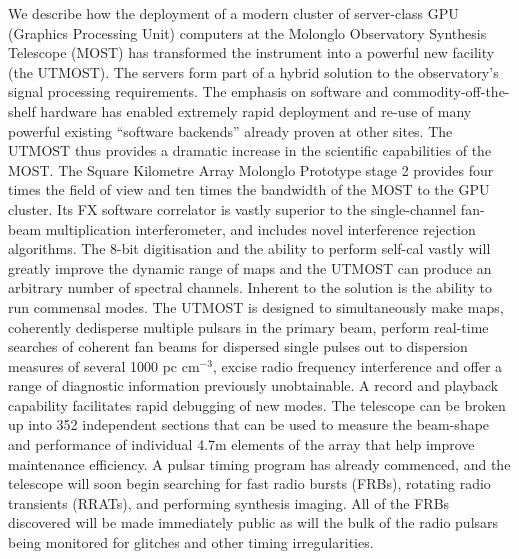 We describe how the deployment of a modern cluster of server-class GPU (Graphics Processing Unit) computers at the Molonglo Observatory Synthesis Telescope (MOST) has transformed the instrument into a powerful new facility (the UTMOST). The servers form part of a hybrid solution to the observatory's signal processing requirements. The emphasis on software and commodity-off-the-shelf hardware has enabled extremely rapid deployment and re-use of many powerful existing ``software backends'' already proven at other sites. The UTMOST thus provides a dramatic increase in the scientific capabilities of the MOST. The Square Kilometre Array Molonglo Prototype stage 2 provides four times the field of view and ten times the bandwidth of the MOST to the GPU cluster. Its FX software correlator is vastly superior to the single-channel fan-beam multiplication interferometer, and includes novel interference rejection algorithms. The 8-bit digitisation and the ability to perform self-cal vastly will greatly improve the dynamic range of maps and the UTMOST can produce an arbitrary number of spectral channels. Inherent to the solution is the ability to run commensal modes. The UTMOST is designed to simultaneously make maps, coherently dedisperse multiple pulsars in the primary beam, perform real-time searches of coherent fan beams for dispersed single pulses out to dispersion measures of several 1000 pc cm$^{-3}$, excise radio frequency interference and offer a range of diagnostic information previously unobtainable. A record and playback capability facilitates rapid debugging of new modes. The telescope can be broken up into 352 independent sections that can be used to measure the beam-shape and performance of individual 4.7m elements of the array that help improve maintenance efficiency. A pulsar timing program has already commenced, and the telescope will soon begin searching for fast radio bursts (FRBs), rotating radio transients (RRATs), and performing synthesis imaging. All of the FRBs discovered will be made immediately public as will the bulk of the radio pulsars being monitored for glitches and other timing irregularities. 
